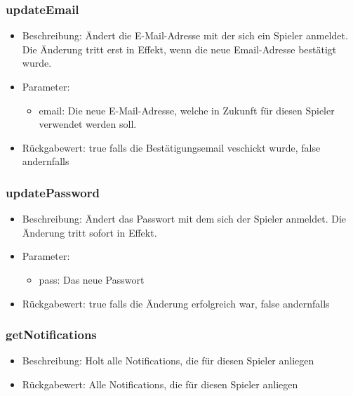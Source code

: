 \documentclass[a4paper]{scrreprt}
\begin{document}
    \subsubsection{updateEmail}
    \begin{itemize}
        \item Beschreibung: Ändert die E-Mail-Adresse mit der sich ein Spieler anmeldet. Die Änderung tritt erst in Effekt, wenn die neue Email-Adresse bestätigt wurde.
        \item Parameter:
        \begin{itemize}
            \item email: Die neue E-Mail-Adresse, welche in Zukunft für diesen Spieler verwendet werden soll.
        \end{itemize}
        \item Rückgabewert: true falls die Bestätigungsemail veschickt wurde, false andernfalls 
    \end{itemize}
    \subsubsection{updatePassword}
    \begin{itemize}
        \item Beschreibung: Ändert das Passwort mit dem sich der Spieler anmeldet. Die Änderung tritt sofort in Effekt.
        \item Parameter:
        \begin{itemize}
            \item pass: Das neue Passwort
        \end{itemize}
        \item Rückgabewert: true falls die Änderung erfolgreich war, false andernfalls 
    \end{itemize}
    \subsubsection{getNotifications}
    \begin{itemize}
        \item Beschreibung: Holt alle Notifications, die für diesen Spieler anliegen
        \item Rückgabewert:  Alle Notifications, die für diesen Spieler anliegen
    \end{itemize}
\end{document}
